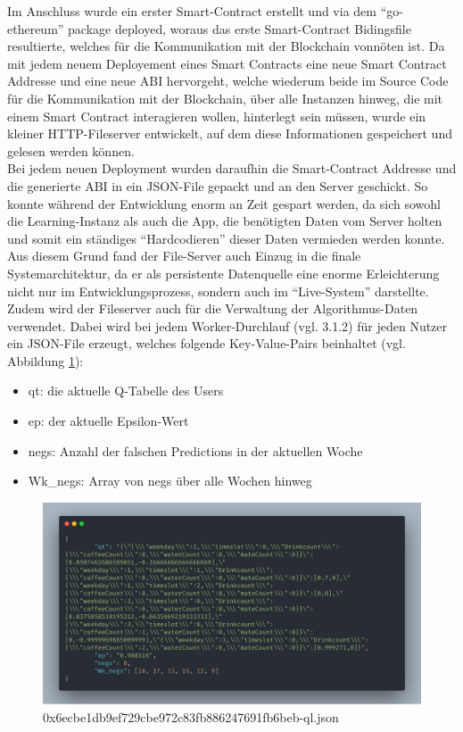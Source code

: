 Im Anschluss wurde ein erster Smart-Contract erstellt und via dem “go-ethereum” package deployed, woraus das erste Smart-Contract Bidingsfile resultierte, welches für die Kommunikation mit der Blockchain vonnöten ist. Da mit jedem neuem Deployement eines Smart Contracts eine neue Smart Contract Addresse und eine neue ABI hervorgeht, welche wiederum beide im Source Code für die Kommunikation mit der Blockchain, über alle Instanzen hinweg, die mit einem Smart Contract interagieren wollen, hinterlegt sein müssen, wurde ein kleiner HTTP-Fileserver entwickelt, auf dem diese Informationen gespeichert und gelesen werden können. \\
Bei jedem neuen Deployment wurden daraufhin die Smart-Contract Addresse und die generierte ABI in ein JSON-File gepackt und an den Server geschickt. So konnte während der Entwicklung enorm an Zeit gespart werden, da sich sowohl die Learning-Instanz als auch die App, die benötigten Daten vom Server holten und somit ein ständiges “Hardcodieren” dieser Daten vermieden werden konnte. \\
Aus diesem Grund fand der File-Server auch Einzug in die finale Systemarchitektur, da er als persistente Datenquelle eine enorme Erleichterung nicht nur im Entwicklungsprozess, sondern auch im “Live-System” darstellte. \\
Zudem wird der Fileserver auch für die Verwaltung der Algorithmus-Daten verwendet. Dabei wird bei jedem Worker-Durchlauf (vgl. 3.1.2) für jeden Nutzer ein JSON-File erzeugt, welches folgende Key-Value-Pairs beinhaltet (vgl. Abbildung \ref{img:abb1}): 
\begin{itemize}
	\item qt: die aktuelle Q-Tabelle des Users
	\item ep: der aktuelle Epsilon-Wert
	\item negs: Anzahl der falschen Predictions in der aktuellen Woche
	\item Wk\_negs: Array von negs über alle Wochen hinweg
\end{itemize}


\begin{figure}[th!]
    \centering
    \includegraphics[width=.9\columnwidth]{./Abbildungen/Kapitel_03/usr_json.png}
    \caption{0x6ecbe1db9ef729cbe972c83fb886247691fb6beb-ql.json}
    \label{img:abb1}
\end{figure}

